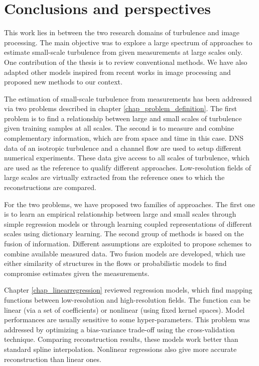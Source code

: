 \chapter*{Conclusions and perspectives} 
\label{chap_conclusion_perspectives} 
This work lies in between the two research domains of turbulence and image processing. The main objective was to explore a large spectrum of approaches to estimate small-scale turbulence from given measurements at large scales only. One contribution of the thesis is to review conventional methods. We have also adapted other models inspired from recent works in image processing and proposed new methods to our context. 

The estimation of small-scale turbulence from measurements has been addressed via two problems described in chapter \ref{chap_problem_definition}. The first problem is to find a relationship between large and small scales of turbulence given training samples at all scales. The second is to measure and combine complementary information, which are from space and time in this case. DNS data of an isotropic turbulence and a channel flow are used to setup different numerical experiments. These data give access to all scales of turbulence, which are used as the reference to qualify different approaches. Low-resolution fields of large scales are virtually extracted from the reference ones to which the reconstructions are compared. 

For the two problems, we have proposed two families of approaches. The first one is to learn an empirical relationship between large and small scales through simple regression models or through learning coupled representations of different scales using dictionary learning. The second group of methods is based on the fusion of information. Different assumptions are exploited to propose schemes to combine available measured data. Two fusion models are developed, which use either similarity of structures in the flows or probabilistic models to find compromise estimates given the measurements. 

Chapter \ref{chap_linearregression} reviewed regression models, which find mapping functions between low-resolution and high-resolution fields. The function can be linear (via a set of coefficients) or nonlinear (using fixed kernel spaces). Model performances are usually sensitive to some hyper-parameters. This problem was addressed by optimizing a bias-variance trade-off using the cross-validation technique. Comparing reconstruction results, these models work better than standard spline interpolation. Nonlinear regressions also give more accurate reconstruction than linear ones. 

